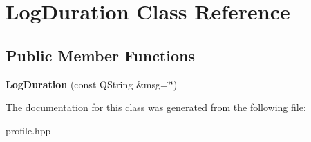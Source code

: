 \hypertarget{classLogDuration}{}\section{Log\+Duration Class Reference}
\label{classLogDuration}
\subsection*{Public Member Functions}
\begin{DoxyCompactItemize}
\item 
\mbox{\label{classLogDuration_a1d0ce7240c3538b9f5ceb2a8fc7f3ecb}} 
{\bfseries Log\+Duration} (const Q\+String \&msg=\char`\"{}\char`\"{})
\end{DoxyCompactItemize}


The documentation for this class was generated from the following file\+:\begin{DoxyCompactItemize}
\item 
profile.\+hpp\end{DoxyCompactItemize}
